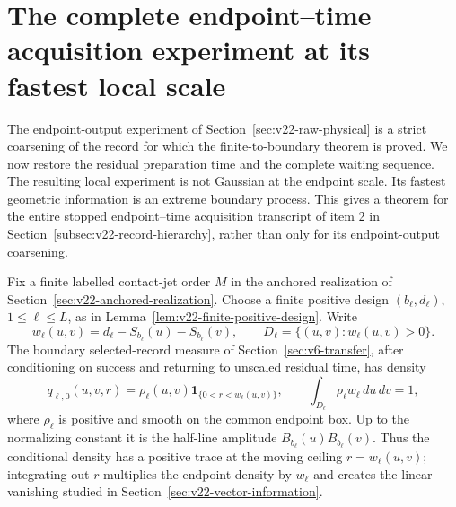 \section{The complete endpoint--time acquisition experiment at its fastest local scale}
\label{sec:v23-full-endpoint-time}

The endpoint-output experiment of Section~\ref{sec:v22-raw-physical} is a
strict coarsening of the record for which the finite-to-boundary theorem is
proved.  We now restore the residual preparation time and the complete waiting
sequence.  The resulting local experiment is not Gaussian at the endpoint
scale.  Its fastest geometric information is an extreme boundary process.
This gives a theorem for the entire stopped endpoint--time acquisition
transcript of item 2 in Section~\ref{subsec:v22-record-hierarchy}, rather than
only for its endpoint-output coarsening.

Fix a finite labelled contact-jet order \(M\) in the anchored realization of
Section~\ref{sec:v22-anchored-realization}.  Choose a finite positive design
\((b_\ell,d_\ell)\), \(1\le\ell\le L\), as in
Lemma~\ref{lem:v22-finite-positive-design}.  Write
\[
 w_\ell(u,v)=d_\ell-S_{b_\ell}(u)-S_{b_\ell}(v),
 \qquad
 D_\ell=\{(u,v):w_\ell(u,v)>0\}.
\]
The boundary selected-record measure of Section~\ref{sec:v6-transfer}, after
conditioning on success and returning to unscaled residual time, has density
\begin{equation}\label{eq:v23-et-base-density}
 q_{\ell,0}(u,v,r)
 =\rho_\ell(u,v)
   \mathbf 1_{\{0<r<w_\ell(u,v)\}},
 \qquad
 \int_{D_\ell}\rho_\ell w_\ell\,du\,dv=1,
\end{equation}
where \(\rho_\ell\) is positive and smooth on the common endpoint box.  Up to
the normalizing constant it is the half-line amplitude
\(B_{b_\ell}(u)B_{b_\ell}(v)\).  Thus the conditional density has a positive
trace at the moving ceiling \(r=w_\ell(u,v)\); integrating out \(r\)
multiplies the endpoint density by \(w_\ell\) and creates the linear vanishing
studied in Section~\ref{sec:v22-vector-information}.

